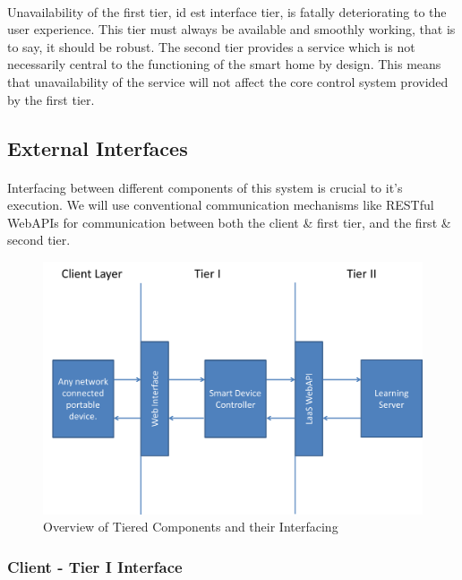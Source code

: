 \paragraph{}
Unavailability of the first tier, id est interface tier, is fatally deteriorating to the user experience. This tier must always be available and smoothly working, that is to say, it should be robust. The second tier provides a service which is not necessarily central to  the functioning of the smart home by design. This means that unavailability of the service will not affect the core control system provided by the first tier.

\pagebreak
\subsection{External Interfaces}
\paragraph{}
Interfacing between different components of this system is crucial to it's execution. We will use conventional communication mechanisms like RESTful WebAPIs for communication between both the client \& first tier, and the first \& second tier.
\begin{figure}[H]
		\includegraphics[width=\textwidth]{./Chapter3/client-t1-t2}
			\caption{Overview of Tiered Components and their Interfacing}
	\end{figure}
	\subsubsection*{Client - Tier I Interface}
